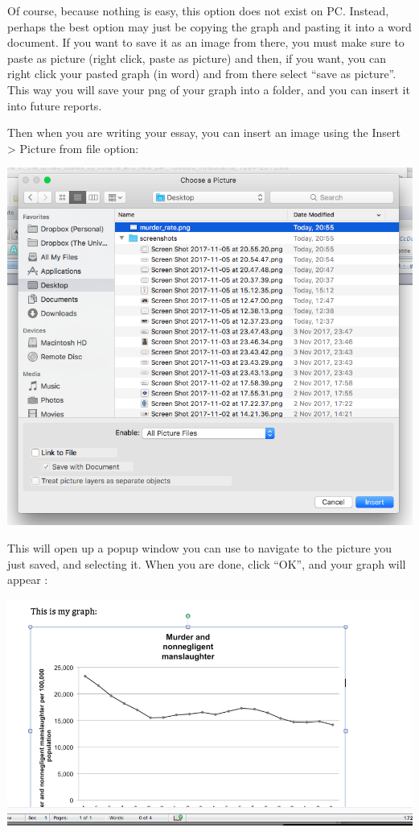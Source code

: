 \documentclass[
]{book}
\begin{document}
Of course, because nothing is easy, this option does not exist on PC. Instead, perhaps the best option may just be copying the graph and pasting it into a word document. If you want to save it as an image from there, you must make sure to paste as picture (right click, paste as picture) and then, if you want, you can right click your pasted graph (in word) and from there select ``save as picture''. This way you will save your png of your graph into a folder, and you can insert it into future reports.

Then when you are writing your essay, you can insert an image using the Insert \textgreater{} Picture from file option:

\includegraphics{imgs/find_pic.png}

This will open up a popup window you can use to navigate to the picture you just saved, and selecting it. When you are done, click ``OK'', and your graph will appear :

\includegraphics{imgs/inserted_graph.png}
\end{document}
